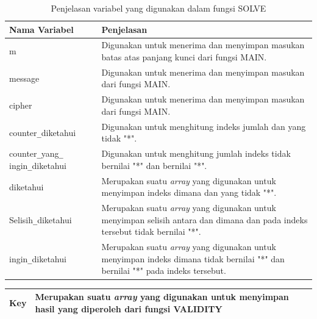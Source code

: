 	\begin{table}[H]
	 	\caption{Penjelasan variabel yang digunakan dalam fungsi SOLVE}
		\begin{tabular}   {|p{3cm}|p{6cm}|}\hline
		Nama Variabel&Penjelasan \\ \hline
		m&Digunakan untuk menerima dan menyimpan masukan batas atas panjang kunci dari fungsi MAIN. \\ \hline
		message&Digunakan untuk menerima dan menyimpan masukan \plaintext dari fungsi MAIN.\\ \hline
		cipher&Digunakan untuk menerima dan menyimpan masukan \ciphertext dari fungsi MAIN. \\ \hline
		counter\verb|_|diketahui&Digunakan untuk menghitung indeks jumlah \plaintext dan \ciphertext yang tidak "*". \\ \hline
		counter\verb|_|yang\verb|_| ingin\verb|_|diketahui&Digunakan untuk menghitung jumlah indeks \ciphertext tidak bernilai "*" dan \plaintext bernilai "*". \\ \hline
		diketahui&Merupakan suatu \textit{array} yang digunakan untuk menyimpan indeks dimana \plaintext dan \ciphertext yang tidak "*". \\ \hline
		Selisih\verb|_|diketahui&Merupakan suatu \textit{array} yang digunakan untuk menyimpan selisih antara \plaintext dan \ciphertext dimana \plaintext dan \ciphertext pada indeks tersebut tidak bernilai "*". \\ \hline
		ingin\verb|_|diketahui&Merupakan suatu \textit{array} yang digunakan untuk menyimpan indeks dimana  \ciphertext tidak bernilai "*" dan \plaintext bernilai "*" pada indeks tersebut. \\ \hline
		\end{tabular}%
		\label{tab:solvar}
	\end{table}
  	\begin{table}[H]
	 	
		\begin{tabular}   {|p{3cm}|p{6cm}|}\hline
		
		
		Key&Merupakan suatu \textit{array} yang digunakan untuk menyimpan hasil yang diperoleh dari fungsi VALIDITY \\ \hline
		\end{tabular}%
		\label{tab:solvar}
	\end{table}	
	
	
